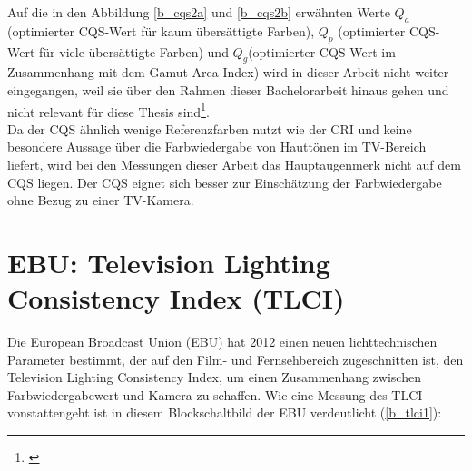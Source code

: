 \noindent Auf die in den Abbildung \ref{b_cqs2a} und \ref{b_cqs2b} erwähnten Werte $Q_{a}$ (optimierter CQS-Wert für kaum übersättigte Farben), $Q_{p}$ (optimierter CQS-Wert für viele übersättigte Farben) und $Q_{g}$(optimierter CQS-Wert im Zusammenhang mit dem Gamut Area Index) wird in dieser Arbeit nicht weiter eingegangen, weil sie über den Rahmen dieser Bachelorarbeit hinaus gehen und nicht relevant für diese Thesis sind\footnote{\cite[60-62]{khanh}}. \\
Da der CQS ähnlich wenige Referenzfarben nutzt wie der CRI und keine besondere Aussage über die Farbwiedergabe von Hauttönen im TV-Bereich liefert, wird bei den Messungen dieser Arbeit das Hauptaugenmerk nicht auf dem CQS liegen. Der CQS eignet sich besser zur Einschätzung der Farbwiedergabe ohne Bezug zu einer TV-Kamera. 


\newpage 
\section{EBU: Television Lighting Consistency Index (TLCI)} \label{sec_tlci}
Die European Broadcast Union (EBU) hat 2012 einen neuen lichttechnischen Parameter bestimmt, der auf den Film- und Fernsehbereich zugeschnitten ist, den Television Lighting Consistency Index, um einen Zusammenhang zwischen Farbwiedergabewert und Kamera zu schaffen.
Wie eine Messung des TLCI vonstattengeht ist in diesem Blockschaltbild der EBU verdeutlicht (\ref{b_tlci1}):


